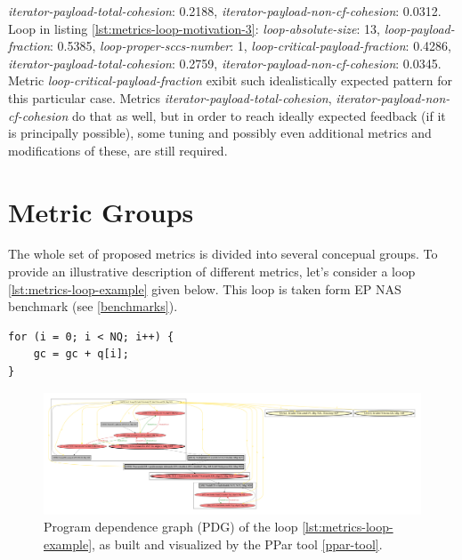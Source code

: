 \textit{iterator-payload-total-cohesion}: 0.2188,
\textit{iterator-payload-non-cf-cohesion}: 0.0312.\newline
\null\qquad Loop in listing \ref{lst:metrics-loop-motivation-3}: \textit{loop-absolute-size}: 13, \textit{loop-payload-fraction}: 0.5385, \textit{loop-proper-sccs-number}: 1, \textit{loop-critical-payload-fraction}: 0.4286,
\textit{iterator-payload-total-cohesion}: 0.2759,
\textit{iterator-payload-non-cf-cohesion}: 0.0345.\newline
\null\qquad Metric \textit{loop-critical-payload-fraction} exibit such idealistically expected pattern for this particular case. Metrics \textit{iterator-payload-total-cohesion}, \textit{iterator-payload-non-cf-cohesion} do that as well, but in order to reach ideally expected feedback (if it is principally possible), some tuning and possibly even additional metrics and modifications of these, are still required.

\section{Metric Groups}
\label{metrics-metric-groups}
\qquad The whole set of proposed metrics is divided into several concepual groups. To provide an illustrative description of different metrics, let's consider a loop \ref{lst:metrics-loop-example} given below. This loop is taken form EP NAS benchmark (see \ref{benchmarks}).
\begin{lstlisting}[caption={Example loop, taken from EP NAS benchmark}, captionpos=b, label=lst:metrics-loop-example]
for (i = 0; i < NQ; i++) {
	gc = gc + q[i];
}
\end{lstlisting}

\begin{figure}[htb]
	\centering
	\includegraphics[width=\linewidth]{figs/metrics-example-loop-pdg.pdf}
	\caption{Program dependence graph (PDG) of the loop \ref{lst:metrics-loop-example}, as built and visualized by the PPar tool \ref{ppar-tool}.}
	\label{metrics-loop-example-pdg}
\end{figure}

